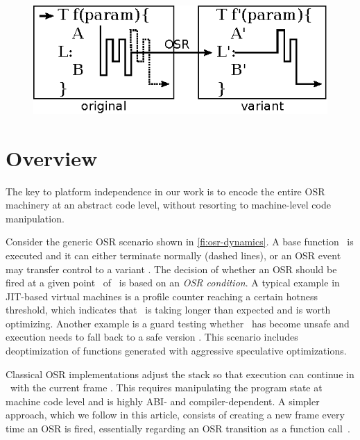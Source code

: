 
\ifdefined\noauthorea
\begin{figure}[t]
\begin{center}
\includegraphics[width=0.6\columnwidth]{figures/overview-osr/overview-osr.eps}
\caption{\protect}
\end{center}
\end{figure}
\fi

\section{Overview}
\label{se:overview}

The key to platform independence in our work is to encode the entire OSR machinery at an abstract code level, without resorting to machine-level code manipulation. %


Consider the generic OSR scenario shown in \ref{fi:osr-dynamics}. A base function \fbase\ is executed and it can either terminate normally (dashed lines), or an OSR event may transfer control to a variant \fvariant. The decision of whether an OSR should be fired at a given point \osrpoint\ of \fbase\ is based on an {\em OSR condition}. A typical example in JIT-based virtual machines is a profile counter reaching a certain hotness threshold, which indicates that \fbase\ is taking longer than expected and is worth optimizing. Another example is a guard testing whether \fbase\ has become unsafe and execution needs to fall back to a safe version \fvariant. This scenario includes deoptimization of functions generated with aggressive speculative optimizations. 

Classical OSR implementations adjust the stack so that execution can continue in \fvariant\ with the current frame \cite{chambers1992design}. This requires manipulating the program state at machine code level and is highly ABI- and compiler-dependent. A simpler approach, which we follow in this article, consists of creating a new frame every time an OSR is fired, essentially regarding an OSR transition as a function call~\cite{Lameed_2013,webkit14}. 

